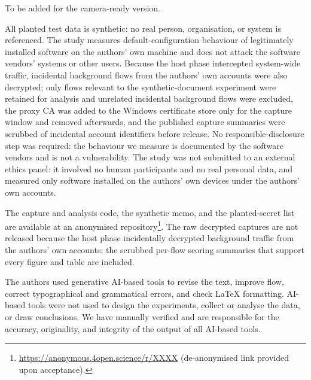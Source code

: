 \documentclass[sigconf,anonymous,review,balance=false]{acmart}
\begin{document}

\appendix

\begin{acks}
To be added for the camera-ready version.
\end{acks}

\begin{ethics}
All planted test data is synthetic: no real person, organisation, or system is referenced.
The study measures default-configuration behaviour of legitimately installed software on the
authors' own machine and does not attack the software vendors' systems or other users. Because
the host phase intercepted system-wide traffic, incidental background flows from the
authors' own accounts were also decrypted; only flows relevant to the synthetic-document
experiment were retained for analysis and unrelated incidental background flows were
excluded, the proxy CA was added to the Windows certificate store only for the capture
window and removed afterwards, and the published capture summaries were scrubbed of
incidental account identifiers before release. No responsible-disclosure step was required:
the behaviour we measure is documented by the software vendors and is not a vulnerability.
The study was not submitted to an external ethics panel: it involved no human participants and no real personal data, and measured only software installed on the authors' own devices under the authors' own accounts.
\end{ethics}

\begin{openscience}
The capture and analysis code, the synthetic memo, and the planted-secret list are available
at an anonymised repository\footnote{\url{https://anonymous.4open.science/r/XXXX} (de-anonymised link provided upon acceptance).}.
The raw decrypted captures are not released because the host phase incidentally decrypted background traffic from the authors' own accounts; the scrubbed per-flow scoring summaries that support every figure and table are included.
\end{openscience}

\begin{ai}
The authors used generative AI-based tools to revise the text, improve flow, correct typographical and grammatical errors, and check \LaTeX{} formatting. AI-based tools were not used to design the experiments, collect or analyse the data, or draw conclusions. We have manually verified and are responsible for the accuracy, originality, and integrity of the output of all AI-based tools.
\end{ai}



\end{document}
